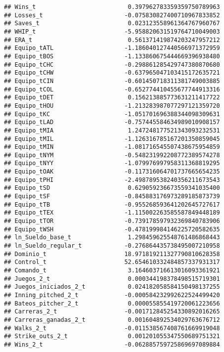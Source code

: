 \documentclass[
]{article}
\begin{document}
\begin{verbatim}
## Wins_t                          0.397962783359359750789963
## Losses_t                       -0.075830827400710967833852
## Saves_t                         0.023123558961364767960767
## WHIP_t                         -5.958820631519764710049003
## ERA_t                           0.561371419874203247957212
## Equipo_tATL                    -1.186040127440566971372959
## Equipo_tBOS                    -1.133860675444669396938480
## Equipo_tCHC                    -0.298861285429747380870680
## Equipo_tCHW                    -0.637965047103415172635721
## Equipo_tCIN                    -0.601450718311381749003885
## Equipo_tCOL                    -0.652774410455677744913316
## Equipo_tDET                     0.156213885773631211417722
## Equipo_tHOU                    -1.213283987077297121359720
## Equipo_tKC                     -1.051701696388344098309631
## Equipo_tLAD                    -0.757445584634989010908157
## Equipo_tMIA                     1.247248177521343093232531
## Equipo_tMIL                    -1.126316785167201350859045
## Equipo_tMIN                    -1.081716545507438675954859
## Equipo_tNYM                    -0.548231992208772389574278
## Equipo_tNYY                    -1.079976997958311368819295
## Equipo_tOAK                    -0.117316064701737665654235
## Equipo_tPHI                    -2.498789538240356211673543
## Equipo_tSD                      0.629059236673559341035400
## Equipo_tSF                     -0.845883176973289185873739
## Equipo_tTB                     -0.955268593641202645727617
## Equipo_tTEX                    -1.115002263585587849448189
## Equipo_tTOR                    -0.739178597932369840783906
## Equipo_tWSH                    -0.478199984146225720582635
## ln_Sueldo_base_t                1.298459625548761486868443
## ln_Sueldo_regular_t            -0.276864435738495007210958
## Dominio_t                      18.971819211327790810628358
## Control_t                      52.654610332484857337931317
## Comando_t                       3.164603716613016093361921
## Juegos_2_t                      0.000344198378498515719301
## Juegos_iniciados_2_t            0.024182058584150498137255
## Inning_pitched_2_t             -0.000584232992622524499420
## Bateos_pitcher_2_t              0.000055855419720061223656
## Carreras_2_t                   -0.001712845254330892016265
## Carreras_ganadas_2_t            0.001604892534029763676712
## Walks_2_t                      -0.011538567408761669919048
## Strike_outs_2_t                 0.001201055347550689751321
## Wins_2_t                       -0.062885759725869697089884

\end{verbatim}
\end{document}
